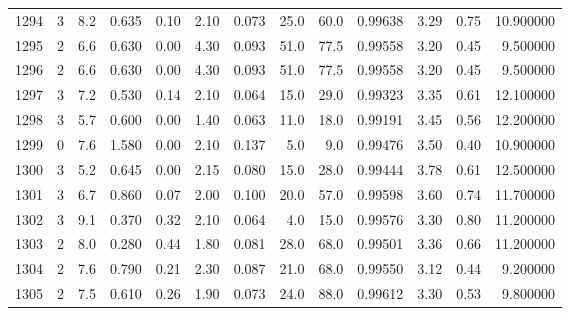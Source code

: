 \begin{tabular}{lrrrrrrrrrrrr}
1294 &        3 &            8.2 &             0.635 &         0.10 &            2.10 &      0.073 &                 25.0 &                  60.0 &  0.99638 &  3.29 &       0.75 &  10.900000 \\
1295 &        2 &            6.6 &             0.630 &         0.00 &            4.30 &      0.093 &                 51.0 &                  77.5 &  0.99558 &  3.20 &       0.45 &   9.500000 \\
1296 &        2 &            6.6 &             0.630 &         0.00 &            4.30 &      0.093 &                 51.0 &                  77.5 &  0.99558 &  3.20 &       0.45 &   9.500000 \\
1297 &        3 &            7.2 &             0.530 &         0.14 &            2.10 &      0.064 &                 15.0 &                  29.0 &  0.99323 &  3.35 &       0.61 &  12.100000 \\
1298 &        3 &            5.7 &             0.600 &         0.00 &            1.40 &      0.063 &                 11.0 &                  18.0 &  0.99191 &  3.45 &       0.56 &  12.200000 \\
1299 &        0 &            7.6 &             1.580 &         0.00 &            2.10 &      0.137 &                  5.0 &                   9.0 &  0.99476 &  3.50 &       0.40 &  10.900000 \\
1300 &        3 &            5.2 &             0.645 &         0.00 &            2.15 &      0.080 &                 15.0 &                  28.0 &  0.99444 &  3.78 &       0.61 &  12.500000 \\
1301 &        3 &            6.7 &             0.860 &         0.07 &            2.00 &      0.100 &                 20.0 &                  57.0 &  0.99598 &  3.60 &       0.74 &  11.700000 \\
1302 &        3 &            9.1 &             0.370 &         0.32 &            2.10 &      0.064 &                  4.0 &                  15.0 &  0.99576 &  3.30 &       0.80 &  11.200000 \\
1303 &        2 &            8.0 &             0.280 &         0.44 &            1.80 &      0.081 &                 28.0 &                  68.0 &  0.99501 &  3.36 &       0.66 &  11.200000 \\
1304 &        2 &            7.6 &             0.790 &         0.21 &            2.30 &      0.087 &                 21.0 &                  68.0 &  0.99550 &  3.12 &       0.44 &   9.200000 \\
1305 &        2 &            7.5 &             0.610 &         0.26 &            1.90 &      0.073 &                 24.0 &                  88.0 &  0.99612 &  3.30 &       0.53 &   9.800000 \\

\end{tabular}
